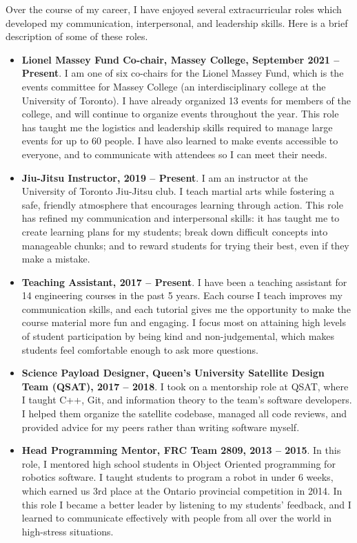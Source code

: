 \documentclass[a4paper,12pt]{article}
\begin{document}
Over the course of my career, I have enjoyed several extracurricular
roles which developed my communication, interpersonal, and leadership skills.
Here is a brief description of some of these roles.
\begin{itemize}
\item \textbf{Lionel Massey Fund Co-chair, Massey College, September 2021 -- Present}.
    I am one of six co-chairs for the Lionel Massey Fund, which is the events
    committee for Massey College (an interdisciplinary college at the University
    of Toronto).
    I have already organized 13 events for members of the college, and will
    continue to organize events throughout the year.
    This role has taught me the logistics and leadership skills required to
    manage large events for up to 60 people.
    I have also learned to make events accessible to everyone, and to
    communicate with attendees so I can meet their needs.

\item \textbf{Jiu-Jitsu Instructor, 2019 -- Present}. 
    I am an instructor at the University of Toronto Jiu-Jitsu club. I teach
    martial arts while fostering a safe, friendly atmosphere that
    encourages learning through action.
    This role has refined my communication and interpersonal skills:
    it has taught me to create learning plans for my students;
    break down difficult concepts into manageable chunks; 
    and to reward students for trying their best, even if they make a mistake.

\item \textbf{Teaching Assistant, 2017 -- Present}.
    I have been a teaching assistant for 14 engineering courses in the past 5 years.
    Each course I teach improves my communication skills, and each tutorial gives
    me the opportunity to make the course material more fun and engaging.
    I focus most on attaining high levels of student participation by being
    kind and non-judgemental, which makes students feel
    comfortable enough to ask more questions.

\item \textbf{Science Payload Designer, Queen’s University Satellite Design
    Team (QSAT), 2017 -- 2018}. 
    I took on a mentorship role at QSAT, where I taught C++, Git, and information
    theory to the team's software developers. I helped them organize
    the satellite codebase, managed all code reviews, and provided advice for my
    peers rather than writing software myself.

\item \textbf{Head Programming Mentor, FRC Team 2809, 2013 -- 2015}. 
    In this role, I mentored high school students in Object Oriented programming
    for robotics software. I taught students to program a robot in under 6
    weeks, which earned us 3rd place at the Ontario provincial competition in
    2014.
    In this role I became a better leader by listening to my students' feedback,
    and I learned to communicate effectively with people from all over the world
    in high-stress situations.

\end{itemize}
\end{document}
